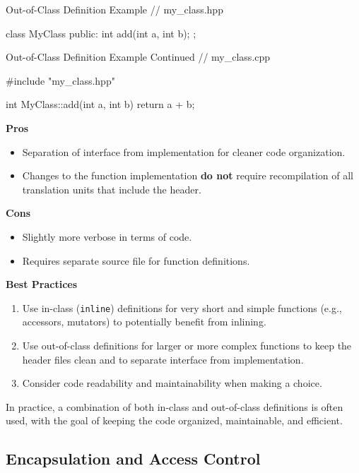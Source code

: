 \begin{neonlisting}[language=C++]{Out-of-Class Definition Example}
// my\_class.hpp

class MyClass {
public:
    int add(int a, int b);
};
\end{neonlisting}

\begin{neonlisting}[language=C++]{Out-of-Class Definition Example Continued}
// my\_class.cpp

#include "my\_class.hpp"

int MyClass::add(int a, int b) {
    return a + b;
}
\end{neonlisting}

\textbf{Pros}

\begin{itemize}
    \item Separation of interface from implementation for cleaner code organization.
    \item Changes to the function implementation \textbf{do not} require recompilation of all translation units that include the header.
\end{itemize}

\textbf{Cons}

\begin{itemize}
    \item Slightly more verbose in terms of code.
    \item Requires separate source file for function definitions.
\end{itemize}

\textbf{Best Practices}

\begin{enumerate}
    \item Use in-class (\texttt{inline}) definitions for very short and simple functions (e.g., accessors, mutators) to potentially benefit from inlining.
    \item Use out-of-class definitions for larger or more complex functions to keep the header files clean and to separate interface from implementation.
    \item Consider code readability and maintainability when making a choice.
\end{enumerate}

In practice, a combination of both in-class and out-of-class definitions is often used, with the goal of keeping the code organized, maintainable, and efficient.

\subsection{Encapsulation and Access Control}

